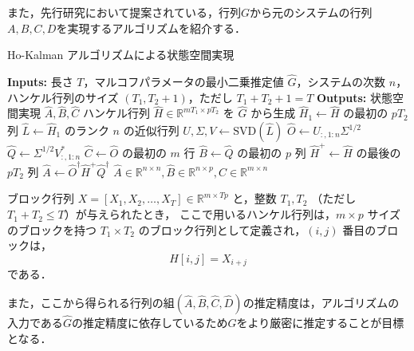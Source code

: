 また，先行研究\cite{RHKB}において提案されている，行列$G$から元のシステムの行列$A, B, C, D$を実現するアルゴリズムを紹介する．
\begin{algorithm}
\caption{Ho-Kalman アルゴリズムによる状態空間実現}
\label{alg:ho-kalman}
\begin{algorithmic}[1]
    \State \textbf{Inputs:} 長さ $T$，マルコフパラメータの最小二乗推定値 $\hat{G}$，システムの次数
    \Statex \hspace{2.0cm}$n$，ハンケル行列のサイズ $(T_1, T_2 + 1)$，ただし $T_1 + T_2 + 1 = T$
    \State \textbf{Outputs:} 状態空間実現 $\hat{A}, \hat{B}, \hat{C}$
    \State ハンケル行列 $\hat{H} \in \mathbb{R}^{mT_1 \times pT_2}$ を $\hat{G}$ から生成
    \State $\hat{H}_1 \gets \hat{H}$ の最初の $pT_2$ 列
    \State $\hat{L} \gets \hat{H}_1$ のランク $n$ の近似行列
    \State $U, \Sigma, V \gets \text{SVD}(\hat{L})$
    \State $\hat{O} \gets U_{:, 1:n} \Sigma^{1/2}$
    \State $\hat{Q} \gets \Sigma^{1/2} V_{:, 1:n}^*$
    \State $\hat{C} \gets \hat{O}$ の最初の $m$ 行
    \State $\hat{B} \gets \hat{Q}$ の最初の $p$ 列
    \State $\hat{H}^{+} \gets \hat{H}$ の最後の $pT_2$ 列
    \State $\hat{A} \gets \hat{O}^{\dagger} \hat{H}^{+} \hat{Q}^{\dagger}$
    \State \Return $\hat{A} \in \mathbb{R}^{n \times n}, \hat{B} \in \mathbb{R}^{n \times p}, \hat{C} \in \mathbb{R}^{m \times n}$
\EndProcedure
\end{algorithmic}
\end{algorithm}

ブロック行列 $X = [X_1, X_2, \dots, X_T] \in \mathbb{R}^{m \times Tp}$ と，整数 $T_1, T_2$ （ただし $T_1 + T_2 \leq T$）が与えられたとき，
ここで用いるハンケル行列は，$m \times p$ サイズのブロックを持つ $T_1 \times T_2$ のブロック行列として定義され，$(i, j)$ 番目のブロックは，
\begin{equation*}
    H[i, j] = X_{i+j}
\end{equation*}
である．

また，ここから得られる行列の組$(\hat{A}, \hat{B}, \hat{C}, \hat{D})$の推定精度は，アルゴリズムの入力である$\hat{G}$の推定精度に依存しているため$G$をより厳密に推定することが目標となる．\cite{RHKB}

